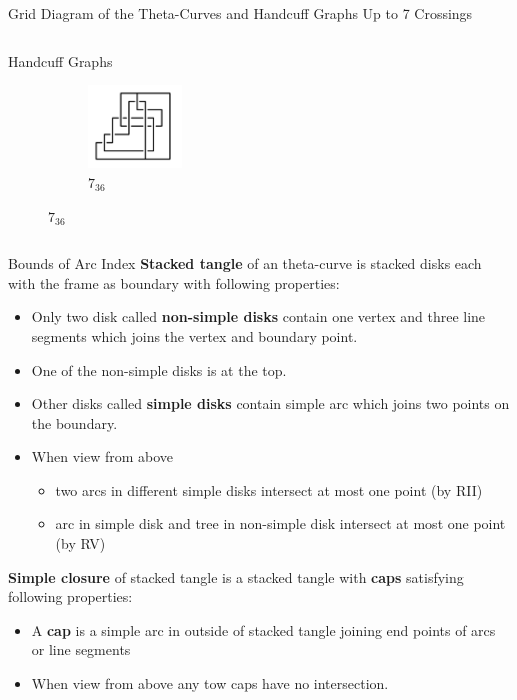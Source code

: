 \documentclass[final]{beamer}
\begin{document}
\begin{frame}[t]
\begin{alertblock}{Grid Diagram of the Theta-Curves and Handcuff Graphs Up to 7 Crossings}
\begin{columns}[t]
\begin{column}{0.3\textwidth}
\begin{alertblock}{Handcuff Graphs}
\begin{figure}
\begin{subfigure}{0.15\textwidth}
    \includegraphics[width=2.5cm]{../Midterm_Poster/grid_diagram/handcuff_7_36.png}
    \caption{$7_{36}$} 
    \end{subfigure}
  \end{figure}
  \end{alertblock}
  \end{column}
  \end{columns}
  \end{alertblock}

\begin{columns}[t]
  \begin{block}{Bounds of Arc Index}
  \textbf{Stacked tangle} of an theta-curve is stacked disks each with the frame as boundary with following properties:
  \begin{itemize}
  \item Only two disk called \textbf{non-simple disks} contain one vertex and three line
  segments which joins the vertex and boundary point.
  \item One of the non-simple disks is at the top.
  \item Other disks called \textbf{simple disks} contain simple arc which joins two
  points on the boundary.
  \item When view from above
  \begin{itemize}
      \item two arcs in different simple disks intersect at most one point (by RII)
      \item arc in simple disk and tree in non-simple disk intersect at most one point (by RV)
  \end{itemize}
  \end{itemize}

  \textbf{Simple closure} of stacked tangle is a stacked tangle with \textbf{caps} satisfying following properties:
  \begin{itemize}
      \item A \textbf{cap} is a simple arc in outside of stacked tangle joining end points of arcs or line segments
      \item When view from above any tow caps have no intersection.
  \end{itemize}


\end{block}
\end{columns}
\end{frame}
\end{document}
